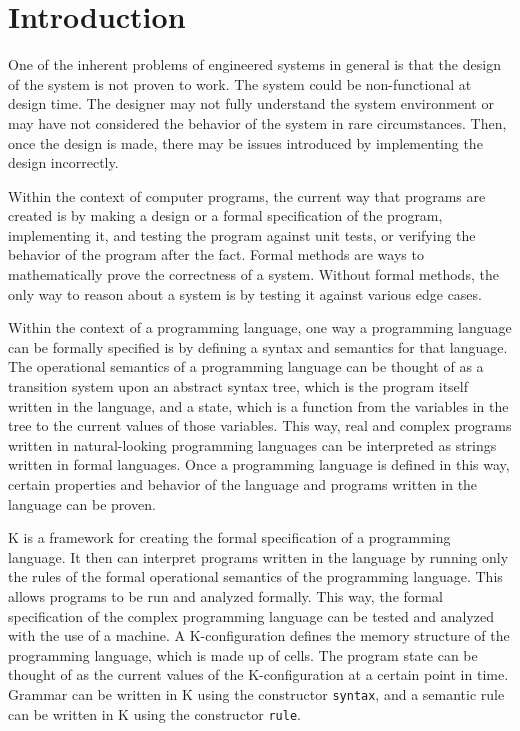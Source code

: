 \chapter{Introduction}
One of the inherent problems of engineered systems in general is that the design of the system is not proven to work. The system could be non-functional at design time. The designer may not fully understand the system environment or may have not considered the behavior of the system in rare circumstances. Then, once the design is made, there may be issues introduced by implementing the design incorrectly.

Within the context of computer programs, the current way that programs are created is by making a design or a formal specification of the program, implementing it, and testing the program against unit tests, or verifying the behavior of the program after the fact.
Formal methods are ways to mathematically prove the correctness of a system. Without formal methods, the only way to reason about a system is by testing it against various edge cases.

Within the context of a programming language, one way a programming language can be formally specified is by defining a syntax and semantics for that language.
The operational semantics of a programming language can be thought of as a transition system upon an abstract syntax tree, which is the program itself written in the language, and a state, which is a function from the variables in the tree to the current values of those variables. 
This way, real and complex programs written in natural-looking programming languages can be interpreted as strings written in formal languages. Once a programming language is defined in this way, certain properties and behavior of the language and programs written in the language can be proven.

K \cite{rosu-serbanuta-2010-jlap, KFrame} is a framework for creating the formal specification of a programming language. It then can interpret programs written in the language by running only the rules of the formal operational semantics of the programming language. This allows programs to be run and analyzed formally. This way, the formal specification of the complex programming language can be tested and analyzed with the use of a machine.
A K-configuration defines the memory structure of the programming language, which is made up of cells. The program state can be thought of as the current values of the K-configuration at a certain point in time.
Grammar can be written in K using the constructor \texttt{syntax}, and a semantic rule can be written in K using the constructor \texttt{rule}.

